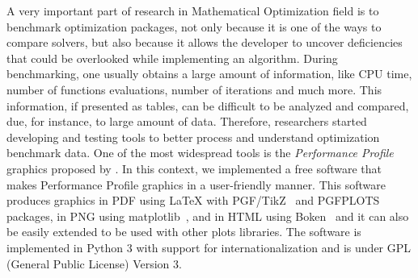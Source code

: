 A very important part of research in Mathematical Optimization field is to benchmark
optimization packages, not only because it is one of the ways to compare
solvers, but also because it allows the developer to uncover deficiencies that could
be overlooked while implementing  an algorithm. During benchmarking, one usually
obtains a large amount of information, like CPU time, number of functions
evaluations, number of iterations and much more. This information, if
presented as tables, can be difficult to be analyzed and compared, due, for instance, to
large amount of data.  Therefore, researchers started developing and testing
tools to better process and understand optimization benchmark data. One of
the most widespread tools  is the \emph{Performance Profile} graphics proposed by
\textcite{Dolan:2002du}. In this context, we implemented a free software
that makes Performance Profile graphics in a user-friendly manner. This software produces graphics in PDF using LaTeX with
PGF/TikZ~\cite{TikZ} and PGFPLOTS~\cite{pgfplots} packages, in
PNG using matplotlib~\cite{Hunter:2007}, and in HTML using
Boken~\cite{url:bokeh} and it can also be easily
extended to be used with other plots libraries. The software is implemented
in Python 3 with support for internationalization and is under GPL (General
Public License) Version 3.
